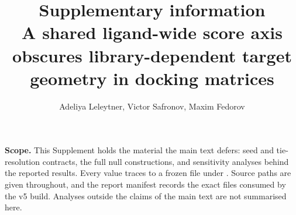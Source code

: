 \documentclass[11pt]{article}
\title{Supplementary information\\[4pt]
\large A shared ligand-wide score axis obscures library-dependent target geometry
in docking matrices}
\author{Adeliya Leleytner, Victor Safronov, Maxim Fedorov}
\date{}
\begin{document}
\linenumbers
\maketitle

\noindent\textbf{Scope.}
This Supplement holds the material the main text defers: seed and tie-resolution contracts,
the full null constructions, and sensitivity analyses behind the reported results. Every value
traces to a frozen file under . Source paths are given throughout, and the report
manifest records the exact files consumed by the v5 build. Analyses outside the claims of the main
text are not summarised here.

\tableofcontents
\clearpage
















\end{document}
